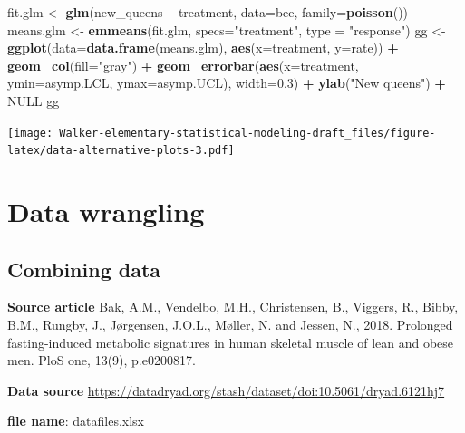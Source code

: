 \documentclass[]{book}
\newenvironment{Shaded}{\begin{snugshade}}{\end{snugshade}}
\newcommand{\KeywordTok}[1]{\textcolor[rgb]{0.13,0.29,0.53}{\textbf{#1}}}
\newcommand{\DataTypeTok}[1]{\textcolor[rgb]{0.13,0.29,0.53}{#1}}
\newcommand{\FloatTok}[1]{\textcolor[rgb]{0.00,0.00,0.81}{#1}}
\newcommand{\StringTok}[1]{\textcolor[rgb]{0.31,0.60,0.02}{#1}}
\newcommand{\OtherTok}[1]{\textcolor[rgb]{0.56,0.35,0.01}{#1}}
\newcommand{\OperatorTok}[1]{\textcolor[rgb]{0.81,0.36,0.00}{\textbf{#1}}}
\newcommand{\NormalTok}[1]{#1}
\begin{document}
\begin{Shaded}
\begin{Highlighting}[]
\NormalTok{fit.glm <-}\StringTok{ }\KeywordTok{glm}\NormalTok{(new_queens }\OperatorTok{~}\StringTok{ }\NormalTok{treatment, }\DataTypeTok{data=}\NormalTok{bee, }\DataTypeTok{family=}\KeywordTok{poisson}\NormalTok{())}
\NormalTok{means.glm <-}\StringTok{ }\KeywordTok{emmeans}\NormalTok{(fit.glm, }\DataTypeTok{specs=}\StringTok{"treatment"}\NormalTok{, }\DataTypeTok{type =} \StringTok{"response"}\NormalTok{)}
\NormalTok{gg <-}\StringTok{ }\KeywordTok{ggplot}\NormalTok{(}\DataTypeTok{data=}\KeywordTok{data.frame}\NormalTok{(means.glm), }\KeywordTok{aes}\NormalTok{(}\DataTypeTok{x=}\NormalTok{treatment, }\DataTypeTok{y=}\NormalTok{rate)) }\OperatorTok{+}
\StringTok{  }\KeywordTok{geom_col}\NormalTok{(}\DataTypeTok{fill=}\StringTok{"gray"}\NormalTok{) }\OperatorTok{+}\StringTok{ }
\StringTok{  }\KeywordTok{geom_errorbar}\NormalTok{(}\KeywordTok{aes}\NormalTok{(}\DataTypeTok{x=}\NormalTok{treatment, }\DataTypeTok{ymin=}\NormalTok{asymp.LCL, }\DataTypeTok{ymax=}\NormalTok{asymp.UCL), }\DataTypeTok{width=}\FloatTok{0.3}\NormalTok{) }\OperatorTok{+}
\StringTok{  }\KeywordTok{ylab}\NormalTok{(}\StringTok{"New queens"}\NormalTok{) }\OperatorTok{+}
\StringTok{  }\OtherTok{NULL}
\NormalTok{gg}
\end{Highlighting}
\end{Shaded}

\texttt{[image: Walker-elementary-statistical-modeling-draft\_files/figure-latex/data-alternative-plots-3.pdf]}

\section{Data wrangling}\label{data-wrangling}

\subsection{Combining data}\label{combining-data}

\textbf{Source article} Bak, A.M., Vendelbo, M.H., Christensen, B.,
Viggers, R., Bibby, B.M., Rungby, J., Jørgensen, J.O.L., Møller, N. and
Jessen, N., 2018. Prolonged fasting-induced metabolic signatures in
human skeletal muscle of lean and obese men. PloS one, 13(9),
p.e0200817.

\textbf{Data source}
\url{https://datadryad.org/stash/dataset/doi:10.5061/dryad.6121hj7}

\textbf{file name}: datafiles.xlsx
\end{document}
